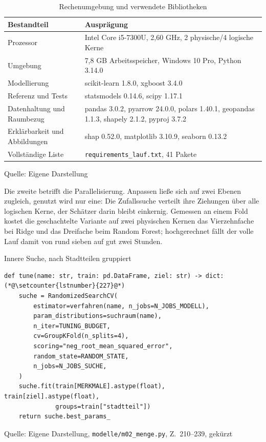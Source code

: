 \documentclass[12pt,a4paper]{article}
\renewcommand{\footnotesize}{\fontsize{10pt}{12pt}\selectfont}
\newcommand{\tabformat}{%
  \centering
  \singlespacing
  \footnotesize
  \setlength{\tabcolsep}{5pt}%
  \renewcommand{\arraystretch}{1.15}%
}
\newcommand{\tabquelle}[1][Eigene Darstellung]{%
  \par\setlength{\parskip}{0pt}\vspace{3pt}%
  {\setstretch{1}\fontsize{9pt}{11pt}\selectfont\raggedright Quelle: #1\par}%
}
\begin{document}
\begin{table}[htbp]
\tabformat
\caption{Rechenumgebung und verwendete Bibliotheken}
\label{tab:techstack}
\begin{tabularx}{\textwidth}{@{}L{4.2cm} Y@{}}
\toprule
\textbf{Bestandteil} & \textbf{Ausprägung} \\
\midrule
Prozessor & Intel Core i5-7300U, 2,60 GHz, 2 physische/4 logische Kerne \\
Umgebung & 7,8 GB Arbeitsspeicher, Windows 10 Pro, Python 3.14.0 \\
\addlinespace
Modellierung & scikit-learn 1.8.0, xgboost 3.4.0 \\
Referenz und Tests & statsmodels 0.14.6, scipy 1.17.1 \\
Datenhaltung und Raumbezug & pandas 3.0.2, pyarrow 24.0.0, polars 1.40.1, geopandas 1.1.3, shapely 2.1.2, pyproj 3.7.2 \\
Erklärbarkeit und Abbildungen & shap 0.52.0, matplotlib 3.10.9, seaborn 0.13.2 \\
\addlinespace
Vollständige Liste & \texttt{requirements\_lauf.txt}, 41 Pakete \\
\bottomrule
\end{tabularx}
\tabquelle
\end{table}

Die zweite betrifft die Parallelisierung. Anpassen ließe sich auf zwei Ebenen
zugleich, genutzt wird nur eine: Die Zufallssuche verteilt ihre Ziehungen über
alle logischen Kerne, der Schätzer darin bleibt einkernig. Gemessen an einem
Fold kostet die geschachtelte Variante auf zwei physischen Kernen das
Vierzehnfache bei Ridge und das Dreifache beim Random Forest; hochgerechnet
fällt der volle Lauf damit von rund sieben auf gut zwei Stunden.

\begin{quellcode}[htbp]
\caption{Innere Suche, nach Stadtteilen gruppiert}
\label{lst:tune}\vspace{-3.5pt}
\begin{lstlisting}[style=pythonstil,firstnumber=210]
def tune(name: str, train: pd.DataFrame, ziel: str) -> dict:(*@\setcounter{lstnumber}{227}@*)
    suche = RandomizedSearchCV(
        estimator=verfahren(name, n_jobs=N_JOBS_MODELL),
        param_distributions=suchraum(name),
        n_iter=TUNING_BUDGET,
        cv=GroupKFold(n_splits=4),
        scoring="neg_root_mean_squared_error",
        random_state=RANDOM_STATE,
        n_jobs=N_JOBS_SUCHE,
    )
    suche.fit(train[MERKMALE].astype(float), train[ziel].astype(float),
              groups=train["stadtteil"])
    return suche.best_params_
\end{lstlisting}
\tabquelle[Eigene Darstellung, \texttt{modelle/m02\_menge.py}, Z.~210--239, gekürzt]
\end{quellcode}
\end{document}
